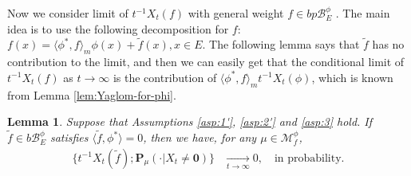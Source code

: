 \documentclass[UTF8]{pkuthss}
\theoremstyle{plain}
\newtheorem{lem}[thm]{Lemma}
\theoremstyle{definition}
\numberwithin{equation}{section}
\begin{document}
Now we consider  limit of $t^{-1} X_t(f)$ with general weight $f\in bp\mathscr B^\phi_E$ . The main idea is to use the following decomposition for $f$:
$f(x)=\langle \phi^*,f\rangle_m \phi(x)+\tilde f(x), x\in E$. The following lemma says that $\tilde f$ has no contribution to the limit, and then we can easily get that the conditional limit of $t^{-1} X_t(f)$ as $t\to\infty$ is the contribution of $\langle \phi^*,f\rangle_mt^{-1}X_t(\phi)$, which is known from Lemma \ref{lem:Yaglom-for-phi}.



\begin{lem}\label{lem:general-lemma}
	Suppose that Assumptions \ref{asp:1'}, \ref{asp:2'} and \ref{asp:3} hold.
	If $\tilde f\in b\mathscr B^\phi_E$ satisfies $\langle \tilde f, \phi^*\rangle = 0$, then we have, for any $\mu \in \mathcal M^\phi_f$,
\[\begin{split}
	\big\{ t^{-1} X_t(\tilde f) ; \mathbf P_\mu(\cdot|X_t \neq \mathbf 0)\big\}
	&\xrightarrow[t\to\infty]{} 0,
	\quad\text{in probability}.
\end{split}\]
\end{lem}
\end{document}
